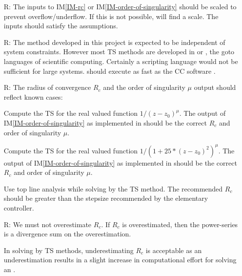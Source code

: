 \documentclass[12pt]{article}
\newcommand{\iref}[1]{IM\ref{#1}}
\newcounter{reqnum} %
\begin{document}
\noindent \begin{itemize}

\item[R\refstepcounter{reqnum}\thereqnum \label{R_Inputs}:] The inputs to
  \iref{IM-rc} or \iref{IM-order-of-singularity} should be scaled to prevent
    overflow/underflow. If this is not possible,  will find
    a scale. The inputs should satisfy the assumptions.


\item[R\refstepcounter{reqnum}\thereqnum \label{R_Calculate}:] The method developed in this
  project is expected to be independent of system constraints. However
  most TS methods are developed in \cpp or \fortran, the goto languages
  of scientific computing. Certainly a scripting language would not be
  sufficient for large systems.  should execute as fast as the CC software \rdcon.

\item[R\refstepcounter{reqnum}\thereqnum \label{R_VerifyOutput}:] The radius of convergence $R_c$
  and the order of singularity $\mu$ output should reflect known cases:

  Compute the TS for the real valued function $1/(z-z_0)^{\mu}$.
    The output of \iref{IM-order-of-singularity} as implemented in 
    should be the correct $R_c$ and order of singularity $\mu$.

  Compute the TS for the real valued function $1/(1 + 25*(z-z_0)^2)^{\mu}$.
    The output of \iref{IM-order-of-singularity} as implemented in 
    should be the correct $R_c$ and order of singularity $\mu$.

  Use top line analysis while solving \ode \ivp by the TS method. The recommended $R_c$ should
    be greater than the stepsize recommended by the elementary controller.

\item[R\refstepcounter{reqnum}\thereqnum \label{R_Output}:] We must not overestimate $R_c$.
  If $R_c$ is overestimated, then the power-series is a divergence sum on the overestimation.

  In \ode solving by TS methods, underestimating $R_c$ is acceptable as an underestimation
  results in a slight increase in computational effort for solving an \ode \ivp.
\end{itemize}
\end{document}
